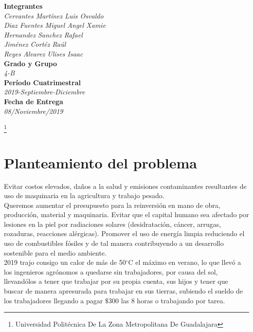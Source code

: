 \documentclass[11pt,a4paper]{article}
\begin{document}
\begin{center}
\textbf{Integrantes}
\\\textit{Cervantes Martínez Luis Osvaldo\\Diaz Fuentes Miguel Angel Xamie\\Hernandez Sanchez Rafael\\Jiménez Cortéz Raúl\\Reyes Alvarez Ulises Isaac}\\

\textbf{Grado y Grupo}\\
\emph{4-B}\\
\textbf{Período Cuatrimestral}\\
\textit{2019-Septiembre-Diciembre}
\\
\textbf{Fecha de Entrega}\\
\textit{08/Noviembre/2019}


\end{center}

\footnote{Universidad Politécnica De La Zona Metropolitana De Guadalajara} 

\newpage

\section{Planteamiento del problema}
Evitar costos elevados, daños a la salud y emisiones contaminantes resultantes de uso de maquinaria en la agricultura y trabajo pesado.\\
Queremos aumentar el presupuesto para la reinversión en mano de obra, producción, material y maquinaria. Evitar que el capital humano sea afectado por lesiones en la piel por radiaciones solares (desidratación, cáncer, arrugas, rozaduras, reacciones alérgicas). Promover el uso de energía limpia reduciendo el uso de combustibles fósiles y de tal manera contribuyendo  a un desarrollo sostenible para el medio ambiente.\\
2019 trajo consigo un calor de más de 50$^{\circ}$C el máximo en verano, lo que llevó a los ingenieros agrónomos a quedarse sin trabajadores, por causa del sol, llevandólos a tener que trabajar por su propia cuenta, sus hijos y tener que buscar de manera apresurada para trabajar en sus tierras, subiendo el sueldo de los trabajadores llegando a pagar $\$300$ las 8 horas o trabajando por tarea. 
\end{document}
